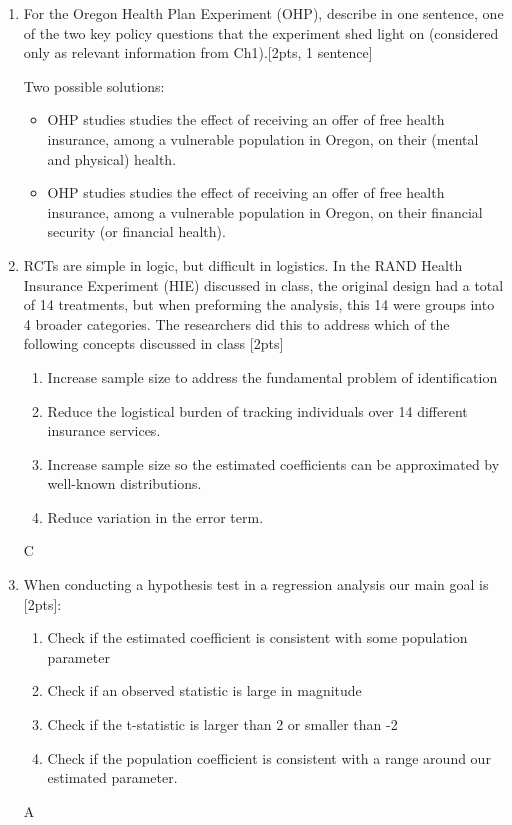 \documentclass[answers]{exam}
\begin{document}
\begin{enumerate}
\item For the Oregon Health Plan Experiment (OHP), describe in one sentence, one of the two key policy questions that the experiment shed light on (considered only as relevant information from Ch1).[2pts, 1 sentence]
\vspace{3cm}
\begin{solution}
Two possible solutions:
\begin{itemize}
    \item OHP studies studies the effect of receiving an offer of free health insurance, among a vulnerable population in Oregon, on their (mental and physical) health. 
    \item OHP studies studies the effect of receiving an offer of free health insurance, among a vulnerable population in Oregon, on their financial security (or financial health). 
\end{itemize}

\end{solution}


\item RCTs are simple in logic, but difficult in logistics. In the RAND Health Insurance Experiment (HIE) discussed in class, the original design had a total of 14 treatments, but when preforming the analysis, this 14 were groups into 4 broader categories. The researchers did this to address which of the following concepts discussed in class [2pts]
 \begin{enumerate}[label=\alph*)]
    \item Increase sample size to address the fundamental problem of identification
    \item Reduce the logistical burden of tracking individuals over 14 different insurance services. 
    \item Increase sample size so the estimated coefficients can be approximated by well-known distributions.
    \item Reduce variation in the error term. 
   \end{enumerate}
\begin{solution}
C
\end{solution}

\item When conducting a hypothesis test in a regression analysis our main goal is [2pts]: 
\begin{enumerate}[label=\alph*)]
    \item Check if the estimated coefficient is consistent with some population parameter
    \item Check if an observed statistic is large in magnitude
    \item Check if the t-statistic is larger than 2 or smaller than -2
    \item Check if the population coefficient is consistent with a range around our estimated parameter.
 \end{enumerate}
\begin{solution}
A
\end{solution}


\end{enumerate}
\end{document}

